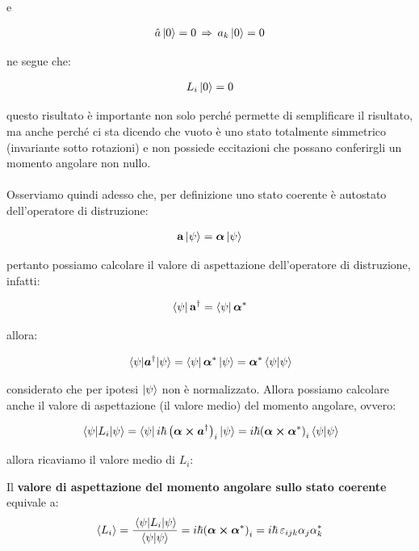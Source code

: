	e

\begin{align*}
	\hat{a} \ket{0} = 0 \, \Rightarrow \, a_k \ket{0} = 0
\end{align*}

	ne segue che:

\begin{nb}
\begin{align*}
	L_i \ket{0} = 0
\end{align*}
\end{nb}
	
	questo risultato è importante non solo perché permette di semplificare il risultato, ma anche perché ci sta dicendo che vuoto è uno stato totalmente simmetrico (invariante sotto rotazioni) e non possiede eccitazioni che possano conferirgli un momento angolare non nullo.
	\\
	\\
	Osserviamo quindi adesso che, per definizione uno stato coerente è autostato dell'operatore di distruzione:
	
\begin{align*}
	\vb{a} \ket{\psi} = \vb*{\alpha} \ket{\psi}
\end{align*}

	pertanto possiamo calcolare il valore di aspettazione dell'operatore di distruzione, infatti:
	
\begin{align*}
	\bra{\psi} \vb{a}^{\dagger} = \bra{\psi} \vb*{\alpha}^*
\end{align*}

	allora:
	
\begin{align*}
	\mel{\psi}{\vb*{a}^{\dagger}}{\psi} = \bra{\psi} \vb*{\alpha}^* \ket{\psi} = \vb*{\alpha}^* \braket{\psi}
\end{align*}

	considerato che per ipotesi $\ket{\psi}$ non è normalizzato. Allora possiamo calcolare anche il valore di aspettazione (il valore medio) del momento angolare, ovvero:
	
\begin{align*}
	\mel{\psi}{L_i}{\psi} = \bra{\psi} i \hbar \, \qty(\vb*{\alpha} \cp \vb*{a}^{\dagger})_i \ket{\psi} = i\hbar \qty(\vb*{\alpha} \cp \vb*{\alpha}^* )_i \braket{\psi}
\end{align*}

	allora ricaviamo il valore medio di $L_i$:

\begin{mydef}
	Il \textbf{valore di aspettazione del momento angolare sullo stato coerente} equivale a: 
\begin{align*}
	\mean{L_i} = \frac{\mel{\psi}{L_i}{\psi}}{\braket{\psi}} = i \hbar \qty(\vb*{\alpha} \cp \vb*{\alpha}^*)_i = i \hbar \, \varepsilon_{ijk} \alpha_j \alpha_k^*
\end{align*}
\end{mydef}


